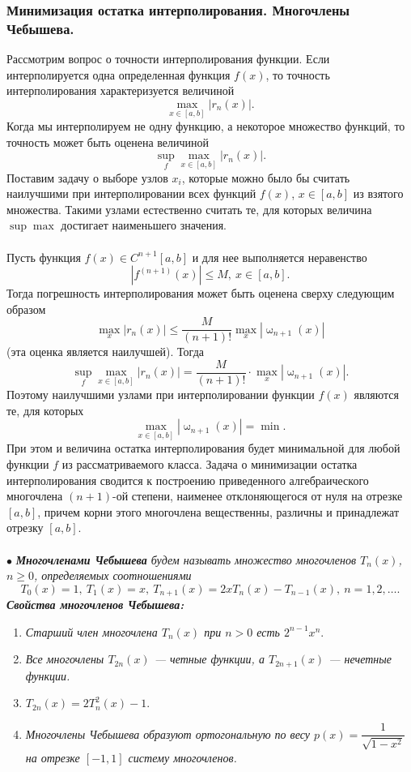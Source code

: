 \documentclass[a4paper, 12pt]{report}
\numberwithin{equation}{section}
\renewcommand{\leq}{\leqslant}
\renewcommand{\geq}{\geqslant}
\renewcommand{\omega}{\upomega}
\begin{document}
	\subsubsection{Минимизация остатка интерполирования. Многочлены Чебышева.}
	Рассмотрим вопрос о точности интерполирования функции. Если интерполируется одна определенная функция $f(x)$, то точность интерполирования характеризуется величиной $$\max_{x\in[a,b]}|r_n(x)|.$$
	Когда мы интерполируем не одну функцию, а некоторое множество функций, то точность может быть оценена величиной $$\sup_f\max_{x\in[a,b]}|r_n(x)|.$$
	Поставим задачу о выборе узлов $x_i$, которые можно было бы считать наилучшими при интерполировании всех функций $f(x)$, $x\in [a,b]$ из взятого множества. Такими узлами естественно считать те, для которых величина $\sup\max$ достигает наименьшего значения. \\\\
	Пусть функция $f(x)\in C^{n+1}[a,b]$ и для нее выполняется неравенство $$|f^{(n+1)}(x)|\leq M, \ x\in [a,b].$$
	Тогда погрешность интерполирования может быть оценена сверху следующим образом $$\max_x |r_n(x)| \leq \dfrac{M}{(n+1)!}\max_x|\omega_{n+1}(x)|$$
	(эта оценка является наилучшей). Тогда $$\sup_f\max_{x\in[a,b]}|r_n(x)| = \dfrac{M}{(n+1)!}\cdot \max_x |\omega_{n+1}(x)|.$$
	Поэтому наилучшими узлами при интерполировании функции $f(x)$ являются те, для которых $$\max_{x\in [a,b]}|\omega_{n+1}(x)|=\min.$$
	При этом и величина остатка интерполирования будет минимальной для любой функции $f$ из рассматриваемого класса.
	Задача о минимизации остатка интерполирования сводится к построению приведенного алгебраического многочлена $(n+1)$-ой степени, наименее отклоняющегося от нуля на отрезке $[a,b]$, причем корни этого многочлена вещественны, различны и принадлежат отрезку $[a,b]$.\\\\
	$\bullet$ \textit{\textbf{Многочленами Чебышева} будем называть множество многочленов $T_n(x)$, $n\geq 0$, определяемых соотношениями} 
	\begin{equation}
		T_0(x)=1,\ T_1(x) = x,\ T_{n+1}(x) = 2xT_n(x) - T_{n-1}(x),\ n=1,2,\ldots.
	\end{equation}
	\textbf{\textit{Свойства многочленов Чебышева:}}
	\begin{enumerate}
		\item \textit{Старший член многочлена $T_n(x)$ при $n > 0$ есть $2^{n-1}x^n$}.
		\item \textit{Все многочлены $T_{2n}(x)$ --- четные функции, а $T_{2n+1}(x)$ --- нечетные функции.}
		\item $T_{2n}(x) = 2T_n^2(x) - 1$.
		\item \textit{Многочлены Чебышева образуют ортогональную по весу $p(x) = \dfrac{1}{\sqrt{1-x^2}}$ на отрезке $[-1, 1]$ систему многочленов.}
	\end{enumerate}
\end{document}
